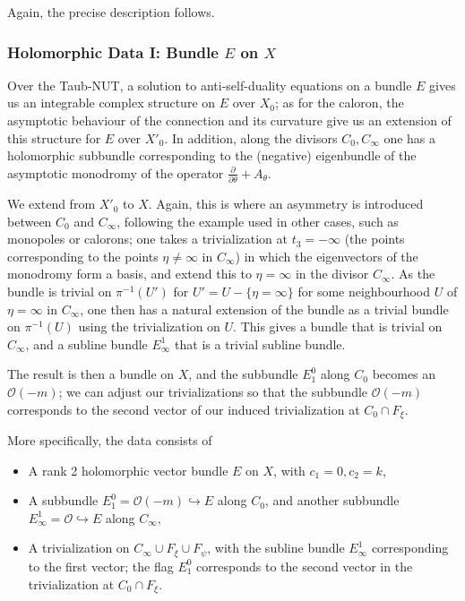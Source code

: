 \documentclass[12pt]{article}
\theoremstyle{definition}
\theoremstyle{remark}
\numberwithin{theorem}{section}
\def\pO{{\mathcal O}}
\begin{document}
Again, the precise description follows.

\subsubsection{Holomorphic Data I: Bundle $E$ on $X$}

Over the  Taub-NUT, a solution to anti-self-duality equations on a bundle $E$  gives us an integrable complex structure on  $E$  over $X_0$; as for the caloron, the asymptotic behaviour of the connection and its curvature give us an extension of this structure for $E$ over $X'_0$.  In addition, along the divisors $C_0, C_\infty$
one has a holomorphic subbundle corresponding to  the (negative) eigenbundle of the asymptotic  monodromy of the operator 
$\frac{\partial}{\partial \theta} + A_\theta$. 

We extend from $X'_0$ to $X$. Again, this is where an asymmetry is introduced between $C_0$ and $C_\infty$, following the example used in other cases, such as monopoles or calorons; one takes a trivialization at $t_3=-\infty$ (the points corresponding to the points $\eta\neq \infty$ in $C_\infty$) in which the eigenvectors of the monodromy form a basis, and extend this to $\eta=\infty$ in the divisor $C_\infty$. As the bundle is trivial on  $\pi^{-1}(U')$  for $U' = U-\{\eta =\infty\}$ for some neighbourhood $U$ of  $\eta=\infty$ in $C_\infty$, one then has a natural extension of the bundle as a trivial bundle on $\pi^{-1}(U)$ using the trivialization on $U$.  This gives a bundle that is trivial on $C_\infty$, and a subline bundle $E_\infty^1$ that is a trivial subline bundle. 

  The result is then a bundle on $X$, and  the subbundle $E^0_1$ along $C_0$ becomes an $\pO(-m)$; we can adjust our trivializations so that the subbundle $\pO(-m)$ corresponds to the second vector of our induced trivialization at $C_0\cap F_\xi$.


More specifically, the data consists of 
\begin{itemize}
\item A rank 2 holomorphic vector bundle $E$ on $X$, with $c_1 = 0, c_2 = k$,
\item A subbundle $E^0_1= \pO(-m)\hookrightarrow E$ along $C_0$, and another  subbundle ${E_\infty^1=\pO\hookrightarrow E}$ along $C_\infty,$
\item A trivialization  on $C_\infty\cup F_\xi\cup F_\psi $, with the subline bundle $E^1_\infty$ corresponding to the first vector; the flag $E^0_1$ corresponds to the second vector in the trivialization at 
$C_0\cap F_\xi$.
\end{itemize}
\end{document}
